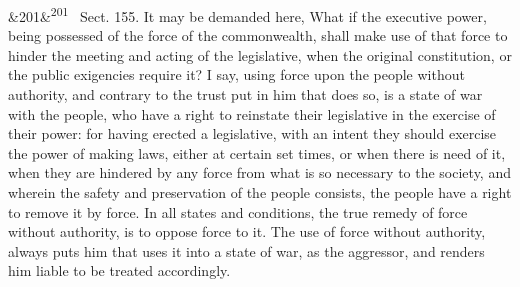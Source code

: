 \documentclass[12pt]{article}
\newcommand{\para}[1][]{\par\noindent\ifx&#1&\else\textsuperscript{\footnotesize #1}~\fi}
\begin{document}
\para[201] Sect. 155. It may be demanded here, What if the executive power, being possessed of the force of the commonwealth, shall make use of that force to hinder the meeting and acting of the legislative, when the original constitution, or the public exigencies require it? I say, using force upon the people without authority, and contrary to the trust put in him that does so, is a state of war with the people, who have a right to reinstate their legislative in the exercise of their power: for having erected a legislative, with an intent they should exercise the power of making laws, either at certain set times, or when there is need of it, when they are hindered by any force from what is so necessary to the society, and wherein the safety and preservation of the people consists, the people have a right to remove it by force. In all states and conditions, the true remedy of force without authority, is to oppose force to it. The use of force without authority, always puts him that uses it into a state of war, as the aggressor, and renders him liable to be treated accordingly.
\end{document}

